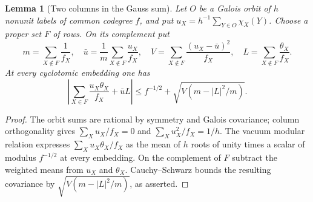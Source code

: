 \documentclass[11pt]{amsart}
\numberwithin{equation}{section}
\newtheorem{lemma}[theorem]{Lemma}
\theoremstyle{definition}
\theoremstyle{plain}
\begin{document}
\begin{lemma}[Two columns in the Gauss sum]\label{odd:centered-column}
Let $O$ be a Galois orbit of $h$ nonunit labels of common codegree $f$,
and put $u_X=h^{-1}\sum_{Y\in O}\chi_X(Y)$. Choose a proper set $F$
of rows. On its complement put
\[
 m=\sum_{X\notin F}\frac1{f_X},\quad
 \bar u=\frac1m\sum_{X\notin F}\frac{u_X}{f_X},\quad
 V=\sum_{X\notin F}\frac{(u_X-\bar u)^2}{f_X},\quad
 L=\sum_{X\notin F}\frac{\theta_X}{f_X}.
\]
At every cyclotomic embedding one has
\[
 \left|\sum_{X\in F}\frac{u_X\theta_X}{f_X}+\bar u L\right|
 \le f^{-1/2}+\sqrt{V\left(m-|L|^2/m\right)} .
\]
\end{lemma}
\begin{proof}
The orbit sums are rational by symmetry and Galois covariance;
column orthogonality gives $\sum_Xu_X/f_X=0$ and
$\sum_Xu_X^2/f_X=1/h$. The vacuum modular relation expresses
$\sum_Xu_X\theta_X/f_X$ as the mean of $h$ roots of unity
times a scalar of modulus $f^{-1/2}$ at every embedding.
On the complement of $F$ subtract the weighted means from $u_X$
and $\theta_X$. Cauchy--Schwarz bounds the resulting covariance
by $\sqrt{V(m-|L|^2/m)}$, as asserted.
\end{proof}
\end{document}
